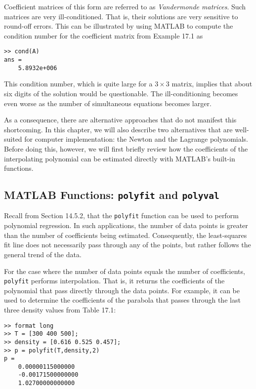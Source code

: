 \documentclass[../main.tex]{subfiles}
\begin{document}
Coefficient matrices of this form are referred to as \textit{Vandermonde matrices}. Such matrices are very ill-conditioned. That is, their solutions are very sensitive to round-off errors.
This can be illustrated by using MATLAB to compute the condition number for the coefficient matrix from Example 17.1 as

\begin{lstlisting}[numbers=none]
	>> cond(A)
ans =
	5.8932e+006
\end{lstlisting}

This condition number, which is quite large for a $3 \times 3$ matrix, implies that about six digits
of the solution would be questionable. The ill-conditioning becomes even worse as the
number of simultaneous equations becomes larger.

As a consequence, there are alternative approaches that do not manifest this shortcoming. In this chapter, we will also describe two alternatives that are well-suited for
computer implementation: the Newton and the Lagrange polynomials. Before doing this,
however, we will first briefly review how the coefficients of the interpolating polynomial
can be estimated directly with MATLAB's built-in functions.

\label{cha:cha_P_17_1_2}
\subsection{MATLAB Functions: \texttt{polyfit} and \texttt{polyval}}

\noindent Recall from Section 14.5.2, that the \texttt{polyfit} function can be used to perform polynomial
regression. In such applications, the number of data points is greater than the number of
coefficients being estimated. Consequently, the least-squares fit line does not necessarily
pass through any of the points, but rather follows the general trend of the data.

For the case where the number of data points equals the number of coefficients, \texttt{polyfit} performs interpolation. That is, it returns the coefficients of the polynomial that pass
directly through the data points. For example, it can be used to determine the coefficients
of the parabola that passes through the last three density values from Table 17.1:

\begin{lstlisting}[numbers=none]
>> format long
>> T = [300 400 500];
>> density = [0.616 0.525 0.457];
>> p = polyfit(T,density,2)
p =
	0.00000115000000
	-0.00171500000000
	1.02700000000000
\end{lstlisting}
\end{document}
